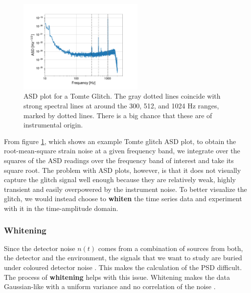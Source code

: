 \documentclass[12pt]{article}
\begin{document}
\begin{figure}[H]
  \centering
  \includegraphics[width=0.55\textwidth]{images/unwhitened_asd.pdf}
  \caption{ASD plot for a Tomte Glitch. The gray dotted lines coincide with strong spectral lines at around the 300, 512, and 1024 Hz ranges, marked by dotted lines. There is a big chance that these are of instrumental origin.}
  \label{fig:asdtomte}
\end{figure}

\medskip
\noindent From figure \ref{fig:asdtomte}, which shows an example Tomte glitch ASD plot, to obtain the root-mean-square strain noise at a given frequency band, we integrate over the squares of the ASD readings over the frequency band of interest and take its square root. The problem with ASD plots, however, is that it does not visually capture the glitch signal well enough because they are relatively weak, highly transient and easily overpowered by the instrument noise. To better visualize the glitch, we would instead choose to \textbf{whiten} the time series data and experiment with it in the time-amplitude domain.


\subsubsection{Whitening}\label{Whitening}


Since the detector noise $n(t)$ comes from a combination of sources from both, the detector and the environment, the signals that we want to study are buried under coloured detector noise \cite{Li:2013lza}. This makes the calculation of the PSD difficult. The process of \textbf{whitening} helps with this issue. Whitening makes the data Gaussian-like with a uniform variance and no correlation of the noise \cite{Li:2013lza}.
\end{document}

